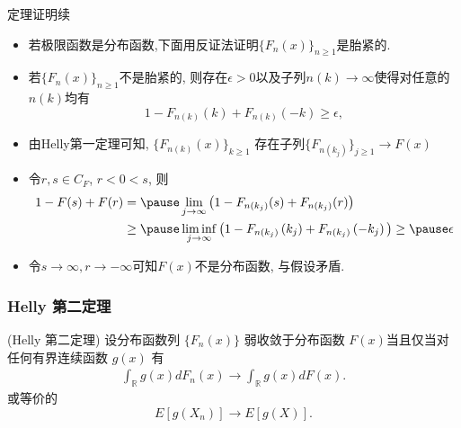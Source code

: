 \begin{frame}{定理证明续}
	\begin{itemize}[<+-|alert@+>]
	\item 若极限函数是分布函数,下面用反证法证明$\{F_n(x)\}_{n\geq 1}$是胎紧的.
	\item 若$\{F_n(x)\}_{n\geq 1}$不是胎紧的, 则存在$\epsilon>0$以及子列$n(k)\rightarrow\infty$使得对任意的$n(k)$均有 \pause
	\[
		1-F_{n(k)}(k)+F_{n(k)}(-k) \geq \epsilon,
		\]
		\item 由Helly第一定理可知, $\{F_{n(k)}(x)\}_{k\geq 1}$ 存在子列$\{F_{n\left(k_{j}\right)}\}_{j\geq 1}\rightarrow F(x)$
		\item 令$r, s\in C_F$, $r<0<s$, 则
	\begin{align*}
		1-F(s)+F(r)  &=\pause \lim _{j \rightarrow \infty} \big(1-F_{n\left(k_{j}\right)}(s)+F_{n\left(k_{j}\right)}(r)\big) \\
		&\geq \pause \liminf _{j \rightarrow \infty} \big(1-F_{n\left(k_{j}\right)}\left(k_{j}\right)+F_{n\left(k_{j}\right)}\left(-k_{j}\right)\big) \geq \pause \epsilon
	\end{align*}
\item 令$s \rightarrow \infty, r \rightarrow-\infty$可知$F(x)$不是分布函数, 与假设矛盾. %
	\end{itemize}

\end{frame}

\begin{frame}
	\frametitle{{\rm Helly} 第二定理}
	\begin{thm}
		({\rm Helly} 第二定理) 设分布函数列 $\{F_n(x)\}$ 弱收敛于分布函数 $F (x)$当且仅当对任何有界连续函数 $g(x)$ 有
		\begin{eqnarray*}
			\int_{\mathbb{R}}g(x)dF_n(x)\rightarrow\int_{\mathbb{R}}g(x)dF(x).
		\end{eqnarray*}
		或等价的\pause
		\[E[g(X_n)]\rightarrow E[g(X)].\]
	\end{thm}

\end{frame}


